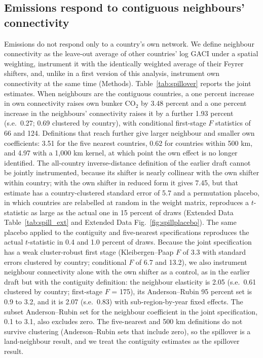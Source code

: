 \documentclass[12pt]{article}
\begin{document}
\subsection*{Emissions respond to contiguous neighbours' connectivity}
Emissions do not respond only to a country's own network. We define
neighbour connectivity as the leave-out average of other countries' log
GACI under a spatial weighting, instrument it with the identically weighted
average of their Feyrer shifters, and, unlike in a first version of this
analysis, instrument own connectivity at the same time (Methods).
Table~\ref{tab:spillover} reports the joint estimates. When neighbours are
the contiguous countries, a one percent increase in own connectivity raises
own bunker CO$_2$ by 3.48 percent and a one percent increase in the
neighbours' connectivity raises it by a further 1.93 percent (s.e.\ 0.27;
0.69 clustered by country), with conditional first-stage $F$ statistics of
66 and 124. Definitions that reach further give larger neighbour and
smaller own coefficients: 3.51 for the five nearest countries, 0.62 for
countries within 500 km, and 4.97 with a 1{,}000 km kernel, at which point
the own effect is no longer identified. The all-country inverse-distance
definition of the earlier draft cannot be jointly instrumented, because its
shifter is nearly collinear with the own shifter within country; with the
own shifter in reduced form it gives 7.45, but that estimate has a
country-clustered standard error of 5.7 and a permutation placebo, in which
countries are relabelled at random in the weight matrix, reproduces a
$t$-statistic as large as the actual one in 15 percent of draws (Extended
Data Table~\ref{tab:spill_ext} and Extended Data
Fig.~\ref{fig:spillplacebo}). The same placebo applied to the contiguity
and five-nearest specifications reproduces the actual $t$-statistic in 0.4
and 1.0 percent of draws. Because the joint specification has a weak
cluster-robust first stage (Kleibergen--Paap $F$ of 3.3 with standard
errors clustered by country; conditional $F$ of 6.7 and 13.2), we also
instrument neighbour connectivity alone with the own shifter as a control,
as in the earlier draft but with the contiguity definition: the neighbour
elasticity is 2.05 (s.e.\ 0.61 clustered by country; first-stage $F$ =
175), its Anderson--Rubin 95 percent set is 0.9 to 3.2, and it is 2.07
(s.e.\ 0.83) with sub-region-by-year fixed effects. The subset
Anderson--Rubin set for the neighbour coefficient in the joint
specification, 0.1 to 3.1, also excludes zero. The five-nearest and 500 km
definitions do not survive clustering (Anderson--Rubin sets that include
zero), so the spillover is a land-neighbour result, and we treat the
contiguity estimates as the spillover result.
\end{document}
